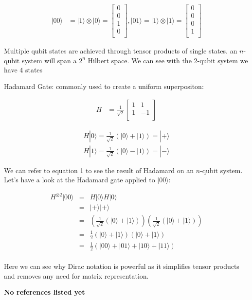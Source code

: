 \documentclass[twocolumn,showpacs,preprintnumbers,amsmath,amssymb]{revtex4}
\begin{document}
		\begin{align*}	
			|00\rangle &= |1\rangle \otimes |0\rangle = \begin{bmatrix}
				0 \\
				0 \\
				1 \\
				0 \\
			\end{bmatrix}, 
			|01\rangle = |1\rangle \otimes |1\rangle = \begin{bmatrix}
				0 \\
				0 \\
				0 \\
				1 \\
			\end{bmatrix}		
		\end{align*}
		
		
		Multiple qubit states are achieved through tensor products of single states.  an $n$- qubit system will span a $2^n$ Hilbert space. We can see with the $2$-qubit system we have $4$ states
		
		Hadamard Gate: commonly used to create a uniform superpositon:
		
		\begin{align*}	
			H &=\frac{1}{\sqrt{2}} \begin{bmatrix}
				1 & 1 \\
				1 &-1 \\
			\end{bmatrix}
		\end{align*}
		
		\begin{align*}	
		H|0\rangle = \frac{1}{\sqrt{2}} (|0\rangle + |1\rangle) = |+\rangle\\
		H|1\rangle = \frac{1}{\sqrt{2}} (|0\rangle - |1\rangle) = |-\rangle
		\end{align*}
			
		We can refer to equation 1 to see the result of Hadamard on an $n$-qubit system. Let's have a look at the Hadamard gate applied to $|00\rangle$:
		
		\begin{align*}	
		H^{\otimes 2}|00\rangle &=& H|0\rangle H|0\rangle\\
		&=& |+\rangle|+\rangle\\
		&=& (\frac{1}{\sqrt{2}} (|0\rangle + |1\rangle))(\frac{1}{\sqrt{2}} (|0\rangle + |1\rangle))\\
		&=& \frac{1}{2} (|0\rangle + |1\rangle)(|0\rangle + |1\rangle)\\
		&=& \frac{1}{2} (|00\rangle + |01\rangle + |10\rangle + |11\rangle)\\
		\end{align*}
		
		Here we can see why Dirac notation is powerful as it simplifies tensor products and removes any need for matrix representation.
		
		\begin{thebibliography}{99}
			
			\textbf{No references listed yet}
			
		\end{thebibliography}
		
		
	
\end{document}
